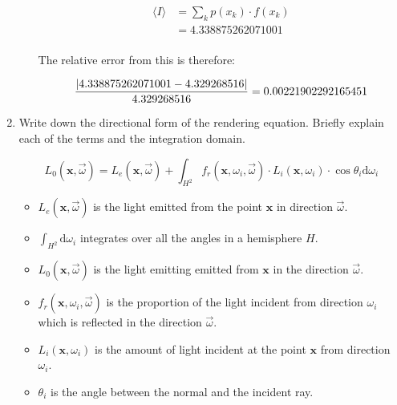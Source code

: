 \documentclass[10pt,\jkfside,a4paper]{article}
\begin{document}
\begin{enumerate}
\begin{enumerate}[label=(\alph*)]
\[
\begin{split}
\langle I \rangle
&= \sum_{k} p(x_k) \cdot f(x_k) \\
&= 4.338875262071001 \\
\end{split}
\]

The relative error from this is therefore:

\[
\frac{|4.338875262071001 - 4.329268516|}{4.329268516} \\
= 0.00221902292165451
\]


\end{enumerate}

\setcounter{enumi}{4}

\item Write down the directional form of the rendering equation. Briefly
explain each of the terms and the integration domain.

\[
L_0(\mathbf{x}, \stackrel{\to}{\omega}) = L_e(\mathbf{x},
\stackrel{\to}{\omega}) + \int_{H^2} f_r
(\mathbf{x}, \omega_i, \stackrel{\to}{\omega})
\cdot
L_i(\mathbf{x}, \omega_i)
\cdot
\cos\theta_i \text{d}\omega_i
\]

\begin{itemize}

\item $L_e(\mathbf{x},\stackrel{\to}{\omega})$ is the light emitted from the
point $\mathbf{x}$ in direction $\stackrel{\to}{\omega}$.

\item $\int_{H^2} \text{d}\omega_i$ integrates over all the angles in a
hemisphere $H$.

\item $L_0(\mathbf{x}, \stackrel{\to}{\omega})$ is the light emitting
emitted from $\mathbf{x}$ in the direction $\stackrel{\to}{\omega}$.

\item $f_r(\mathbf{x}, \omega_i, \stackrel{\to}{\omega})$ is the proportion
of the light incident from direction $\omega_i$ which is reflected in the
direction $\stackrel{\to}{\omega}$.

\item $L_i(\mathbf{x}, \omega_i)$ is the amount of light incident at the
point $\mathbf{x}$ from direction $\omega_i$.

\item $\theta_i$ is the angle between the normal and the incident ray.

\end{itemize}


\end{enumerate}
\end{document}
